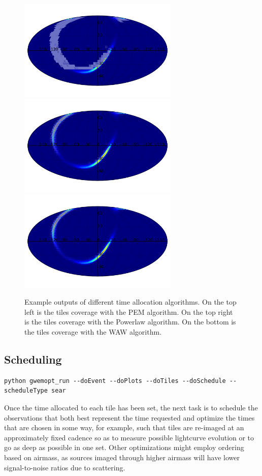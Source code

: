 \documentclass[twocolumn]{aastex61}
\begin{document}
\begin{figure}
    \centering
    \includegraphics[width=3in]{timealloc_pem}
    \includegraphics[width=3in]{timealloc_powerlaw}
    \includegraphics[width=3in]{timealloc_waw}
    \caption{Example outputs of different time allocation algorithms. On the top left is the tiles coverage with the PEM algorithm. On the top right is the tiles coverage with the Powerlaw algorithm. On the bottom is the tiles coverage with the WAW algorithm.}
    \label{fig:timealloc}
\end{figure}


\subsection{Scheduling}
\begin{lstlisting}
python gwemopt_run --doEvent --doPlots --doTiles --doSchedule --scheduleType sear
\end{lstlisting}
Once the time allocated to each tile has been set, the next task is to schedule the observations that both best represent the time requested and optimize the times that are chosen in some way, for example, such that tiles are re-imaged at an approximately fixed cadence so as to measure possible lightcurve evolution or to go as deep as possible in one set.
Other optimizations might employ ordering based on airmass, as sources imaged through higher airmass will have lower signal-to-noise ratios due to scattering.
\end{document}
